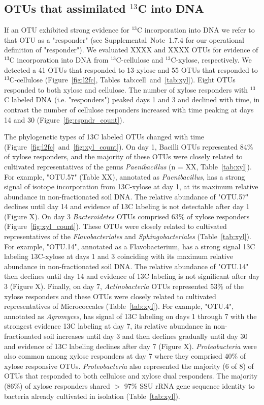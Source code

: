 \subsection{OTUs that assimilated $^{13}$C into DNA} \label{responders}
If an OTU exhibited strong evidence for $^{13}$C incorporation into DNA we
refer to that OTU as a "responder" (see Supplemental Note 1.7.4 for our
operational definition of "responder"). We evaluated XXXX and XXXX OTUs for
evidence of $^{13}$C incorporation into DNA from $^{13}$C-cellulose and
$^{13}$C-xylose, respectively. We detected a 41 OTUs that responded to
13-xylose and 55 OTUs that responded to $^{13}$C-cellulose (Figure~\ref{fig:l2fc}, 
Tables~{tab:cell}~and~\ref{tab:xyl}). Eight OTUs responded to both xylose and cellulose. The number of
xylose responders with $^{13}$C labeled DNA (i.e. "responders") peaked days
1 and 3 and declined with time, in contrast the number of cellulose responders
increased with time peaking at days 14 and 30 (Figure~\ref{fig:rspndr_count}). 

The phylogenetic types of 13C labeled OTUs changed with time (Figure~\ref{fig:l2fc}~and~\ref{fig:xyl_count}).
On day 1, Bacilli OTUs represented 84\% of xylose responders, and the
majority of these OTUs were closely related to cultivated representatives of
the genus \textit{Paenibacillus} (n = XX, Table~\ref{tab:xyl}). For example, "OTU.57"
(Table XX), annotated as \textit{Paenibacillus}, has a strong signal of isotope
incorporation from 13C-xylose at day 1, at its maximum relative abundance in
non-fractionated soil DNA. The relative abundance of "OTU.57" declines until
day 14 and evidence of 13C labeling is not detectable after day 1 (Figure
X). On day 3 \textit{Bacteroidetes} OTUs comprised 63\% of xylose responders
(Figure~\ref{fig:xyl_count}). These OTUs were closely related to cultivated representatives of
the \textit{Flavobacteriales} and \textit{Sphingobacteriales} (Table~\ref{tab:xyl}). For
example, "OTU.14", annotated as a Flavobacterium, has a strong signal 13C
labeling 13C-xylose at days 1 and 3 coinciding with its maximum relative
abundance in non-fractionated soil DNA. The relative abundance of "OTU.14" then
declines until day 14 and evidence of 13C labeling is not significant after day
3 (Figure X). Finally, on day 7, \textit{Actinobacteria} OTUs represented 53\%
of the xylose responders and these OTUs were closely related to cultivated
representatives of Micrococcales (Table~\ref{tab:xyl}). For example, "OTU.4", annotated as
\textit{Agromyces}, has signal of 13C labeling on days 1 through 7 with the
strongest evidence 13C labeling at day 7, its relative abundance in
non-fractionated soil increases until day 3 and then declines gradually until
day 30 and evidence of 13C labeling declines after day 7 (Figure X).
\textit{Proteobacteria} were also common among xylose responders at day 7 where
they comprised 40\% of xylose responsive OTUs. \textit{Proteobacteria} also
represented the majority (6 of 8) of OTUs that responded to both cellulose and
xylose dual responders. The majority (86\%) of xylose responders shared $>$
97\% SSU rRNA gene sequence identity to bacteria already cultivated in
isolation (Table~\ref{tab:xyl}). 

